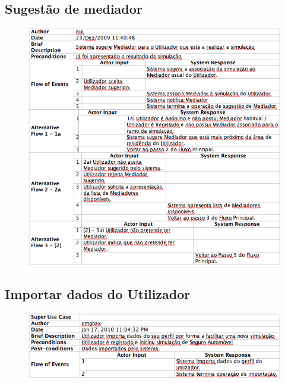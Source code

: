 \subsection{Sugestão de mediador}
\begin{figure}[!htb]
	\centering
	\includegraphics[scale=0.65]{images/Prints/RealizacaoSeguroSaude/SugerirMediador.png}
\end{figure}

\subsection{Importar dados do Utilizador}
\begin{figure}[!htb]
	\centering
	\includegraphics[scale=0.7]{images/Prints/RealizacaoSeguroSaude/ImportarDadosUtilizador.png}
\end{figure}

\pagebreak



